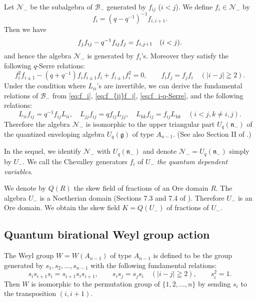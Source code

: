 \documentclass[12pt,twoside]{article}
\newcommand\B{{\mathcal B}}
\newcommand\N{{\mathcal N}}
\newcommand\g{{\mathfrak g}}
\newcommand\n{{\mathfrak n}}
\theoremstyle{plain} %
\theoremstyle{definition} %
\theoremstyle{definition} %
\numberwithin{theorem}{section}
\numberwithin{equation}{section}
\numberwithin{figure}{section}
\numberwithin{table}{section}
\begin{document}
Let $\N_-$ be the subalgebra of $\B_-$ generated by $f_{ij}$ ($i<j$).
We define $f_i\in\N_-$ by
\begin{equation}
 f_i = (q-q^{-1})^{-1} f_{i,i+1}.
 \label{eq:f_i}
\end{equation}
Then we have
\begin{equation}
 f_j f_{ij} - q^{-1} f_{ij} f_j = f_{i,j+1} \quad (i<j).
 \label{eq:f_{ij}f_j}
\end{equation}
and hence the algebra $\N_-$ is generated by $f_i$'s.
Moreover they satisfy the following $q$-Serre relations:
\begin{equation}
 f_i^2 f_{i\pm1} - (q+q^{-1}) f_if_{i\pm1}f_i + f_{i\pm1}f_i^2=0, \qquad
 f_if_j=f_jf_i \quad (|i-j|\geqq 2).
 \label{eq:f_i-q-Serre}
\end{equation}
Under the condition where $L_{ii}$'s are invertible, 
we can derive the fundamental relations of $\B_-$ from
\eqref{eq:f_i}, \eqref{eq:f_{ij}f_j}, \eqref{eq:f_i-q-Serre},  
and the following relations:
\begin{equation*}
 L_{ii}f_{ij}=q^{-1}f_{ij}L_{ii}, \quad
 L_{jj}f_{ij}=q     f_{ij}L_{jj}, \quad
 L_{kk}f_{ij}=f_{ij}L_{kk} \quad
 (i<j, k\ne i,j).
\end{equation*}
Therefore the algebra $\N_-$ is isomorphic to  
the upper triangular part $U_q(\n_-)$ 
of the quantized enveloping algebra $U_q(\g)$ of type $A_{n-1}$.
(See also Section II of \cite{DF}.)

In the sequel, we identify $\N_-$ with $U_q(\n_-)$
and denote $\N_-=U_q(\n_-)$ simply by $U_-$. 
We call the Chevalley generators $f_i$ of $U_-$ 
{\em the quantum dependent variables}.

We denote by $Q(R)$ the skew field of fractions of an Ore domain $R$.
The algebra $U_-$ is a Noetherian domain 
(Sections 7.3 and 7.4 of \cite{Jos-1995}).
Therefore $U_-$ is an Ore domain.
We obtain the skew field $K=Q(U_-)$ of fractions of $U_-$. 


\subsection{Quantum birational Weyl group action}
\label{sec:Weyl-A_{n-1}}

The Weyl group $W=W(A_{n-1})$ of type $A_{n-1}$ is defined to be the group
generated by $s_1,s_2,\ldots,s_{n-1}$ with the following fundamental relations:
\begin{equation}
 s_i s_{i+1}s_i = s_{i+1}s_i s_{i+1}, \qquad
 s_i s_j = s_j s_i \quad (|i-j|\geqq 2), \qquad
 s_i^2 = 1.
 \label{eq:Weyl}
\end{equation}
Then $W$ is isomorphic to the permutation group of $\{1,2,\ldots,n\}$ 
by sending $s_i$ to the transposition $(i,i+1)$.
\end{document}
